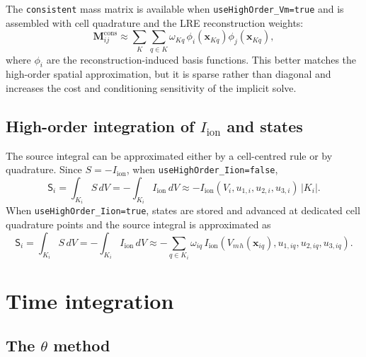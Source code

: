 \documentclass[11pt,a4paper]{article}
\newcommand{\code}[1]{\texttt{\small #1}}
\newcommand{\Vm}{V_m}
\newcommand{\Iion}{I_{\mathrm{ion}}}
\newcommand{\Mmass}{\mathbf{M}}
\begin{document}
The \code{consistent} mass matrix is available when \code{useHighOrder\_Vm=true}
and is assembled with cell quadrature and the LRE reconstruction weights:
\begin{equation}
  \Mmass^{\mathrm{cons}}_{ij}
  \approx
  \sum_{K}\sum_{q\in K}
  \omega_{Kq}\,\phi_i(\mathbf{x}_{Kq})\phi_j(\mathbf{x}_{Kq}),
  \label{eq:consistent}
\end{equation}
where $\phi_i$ are the reconstruction-induced basis functions. This better
matches the high-order spatial approximation, but it is sparse rather than
diagonal and increases the cost and conditioning sensitivity of the implicit
solve.

\subsection{High-order integration of \texorpdfstring{$\Iion$}{Iion} and states}

The source integral can be approximated either by a cell-centred rule or by
quadrature. Since $S=-\Iion$, when \code{useHighOrder\_Iion=false},
\begin{equation}
  \mathsf{S}_i=\int_{K_i} S\,dV
  =
  -\int_{K_i}\Iion\,dV
  \approx
  -\Iion(V_i,u_{1,i},u_{2,i},u_{3,i})\,|K_i|.
\end{equation}
When \code{useHighOrder\_Iion=true}, states are stored and advanced at dedicated
cell quadrature points and the source integral is approximated as
\begin{equation}
  \mathsf{S}_i=\int_{K_i} S\,dV
  =
  -\int_{K_i}\Iion\,dV
  \approx
  -\sum_{q\in K_i}\omega_{iq}\,
  \Iion
  \left(
    \Vm{}_{h}(\mathbf{x}_{iq}),
    u_{1,iq},
    u_{2,iq},
    u_{3,iq}
  \right).
  \label{eq:iion-quadrature}
\end{equation}

\section{Time integration}

\subsection{The \texorpdfstring{$\theta$}{theta} method}
\end{document}
